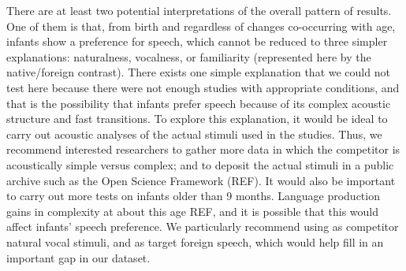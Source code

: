\documentclass[]{apa6}
\begin{document}
There are at least two potential interpretations of the overall pattern
of results. One of them is that, from birth and regardless of changes
co-occurring with age, infants show a preference for speech, which
cannot be reduced to three simpler explanations: naturalness, vocalness,
or familiarity (represented here by the native/foreign contrast). There
exists one simple explanation that we could not test here because there
were not enough studies with appropriate conditions, and that is the
possibility that infants prefer speech because of its complex acoustic
structure and fast transitions. To explore this explanation, it would be
ideal to carry out acoustic analyses of the actual stimuli used in the
studies. Thus, we recommend interested researchers to gather more data
in which the competitor is acoustically simple versus complex; and to
deposit the actual stimuli in a public archive such as the Open Science
Framework (REF). It would also be important to carry out more tests on
infants older than 9 months. Language production gains in complexity at
about this age REF, and it is possible that this would affect infants'
speech preference. We particularly recommend using as competitor natural
vocal stimuli, and as target foreign speech, which would help fill in an
important gap in our dataset.
\end{document}
